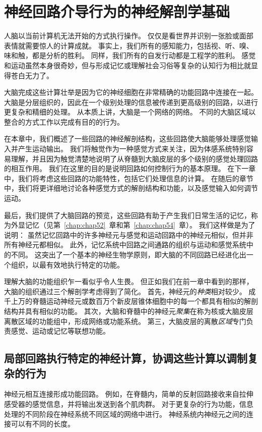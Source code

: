 \chapter{神经回路介导行为的神经解剖学基础} \label{chap:chap4}

人脑以当前计算机无法开始的方式执行操作。
仅仅是看世界并识别一张脸或面部表情就需要惊人的计算成就。
事实上，我们所有的感知能力，包括视、听、嗅、味和触，都是分析的胜利。
同样，我们所有的自发行动都是工程学的胜利。
感觉和运动虽然本身很奇妙，但与形成记忆或理解社会习俗等复杂的认知行为相比就显得苍白无力了。


大脑完成这些计算壮举是因为它的神经细胞在非常精确的功能回路中连接在一起。
大脑是分层组织的，因此在一个级别处理的信息被传递到更高级别的回路，以进行更复杂和精细的处理。 
从本质上讲，大脑是一个网络的网络。 
不同的大脑区域以整合的方式工作以完成有目的的行为。


在本章中，我们概述了一些回路的神经解剖结构，这些回路使大脑能够处理感觉输入并产生运动输出。
我们将触觉作为一种感觉方式来关注，因为体感系统特别容易理解，并且因为触觉清楚地说明了从脊髓到大脑皮层的多个级别的感觉处理回路的相互作用。
我们在这里的目的是说明回路如何控制行为的基本原理。 
在下一章中，我们将考虑这些回路的功能特性，包括它们处理信息的计算。 
在随后的章节中，我们将更详细地讨论各种感觉方式的解剖结构和功能，以及感觉输入如何调节运动。


最后，我们提供了大脑回路的预览，这些回路有助于产生我们日常生活的记忆，称为外显记忆（见第~\ref{chap:chap52}~章和第~\ref{chap:chap54}~章）。
我们这样做是为了说明：
虽然记忆回路中的许多神经元与感觉和运动回路中的神经元相似，但并非所有神经元都相似。
此外，记忆系统中回路之间通路的组织与运动和感觉系统中的不同。
这突出了一个基本的神经生物学原则，即大脑的不同回路已经进化出一个组织，以最有效地执行特定的功能。


理解大脑的功能组织乍一看似乎令人生畏。 
但正如我们在前一章中看到的那样，大脑的组织通过三个解剖学考虑得到了简化。
首先，神经元的\textit{种类}相对较少。 
成千上万的脊髓运动神经元或数百万个新皮层锥体细胞中的每一个都具有相似的解剖结构并具有相似的功能。 
其次，大脑和脊髓中的神经元\textit{聚集}在称为核或大脑皮层离散区域的功能组中，形成网络或功能系统。 
第三，大脑皮层的离散\textit{区域}专门负责感觉、运动或记忆等联想功能。


\section{局部回路执行特定的神经计算，协调这些计算以调制复杂的行为}

神经元相互连接形成功能回路。 
例如，在脊髓内，简单的反射回路接收来自拉伸感受器的感觉信息，并将输出发送到各个肌肉群。
对于更复杂的行为功能，信息处理的不同阶段在神经系统不同区域的网络中进行。 
神经系统内神经元之间的连接可以有不同的长度。


